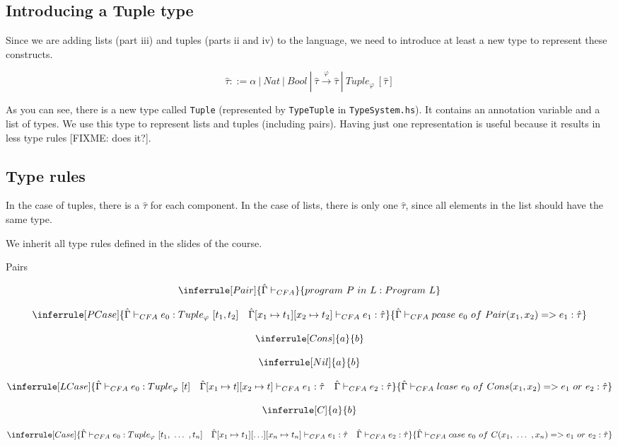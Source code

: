 \documentclass{article}
\begin{document}
\subsection{Introducing a Tuple type}

Since we are adding lists (part iii) and tuples (parts ii and iv) to the language, we need to introduce at least a new type to represent these constructs.

\[\hat{\tau} ::= \alpha\ |\ Nat\ |\ Bool\ |\ \hat{\tau} \overset{\varphi}{\rightarrow} \hat{\tau}\ |\ Tuple_\varphi\ [\hat{\tau}] \]

As you can see, there is a new type called \texttt{Tuple} (represented by \texttt{TypeTuple} in \texttt{TypeSystem.hs}).
It contains an annotation variable and a list of types.
We use this type to represent lists and tuples (including pairs).
Having just one representation is useful because it results in less type rules [FIXME: does it?].

\subsection{Type rules}

In the case of tuples, there is a $\hat{\tau}$ for each component.
In the case of lists, there is only one $\hat{\tau}$, since all elements in the list should have the same type.

We inherit all type rules defined in the slides of the course.

Pairs

\[
\inferrule[Pair]{\hat{\Gamma} \vdash_{CFA}}{program\ P\ in\ L : Program\ L}
\]

\[
\inferrule[PCase]
{\hat{\Gamma} \vdash_{CFA} e_0 : Tuple_\varphi\ [t_1, t_2] \quad \hat{\Gamma}[x_1 \mapsto t_1][x_2 \mapsto t_2] \vdash_{CFA} e_1 : \hat{\tau}}
{\hat{\Gamma} \vdash_{CFA} pcase\ e_0\ of\ Pair(x_1, x_2) => e_1 : \hat{\tau}}
\]

\[
\inferrule[Cons]{a}{b}
\]

\[
\inferrule[Nil]{a}{b}
\]

\[
\inferrule[LCase]
{\hat{\Gamma} \vdash_{CFA} e_0 : Tuple_\varphi\ [t] \quad \hat{\Gamma}[x_1 \mapsto t][x_2 \mapsto t] \vdash_{CFA} e_1 : \hat{\tau} \quad \hat{\Gamma} \vdash_{CFA} e_2 : \hat{\tau}}
{\hat{\Gamma} \vdash_{CFA} lcase\ e_0\ of\ Cons(x_1, x_2) => e_1\ or\ e_2 : \hat{\tau}}
\]

\[
\inferrule[C]{a}{b}
\]

\[
\inferrule[Case]
{\hat{\Gamma} \vdash_{CFA} e_0 : Tuple_\varphi\ [t_1,\ \ldots\ , t_n] \quad \hat{\Gamma}[x_1 \mapsto t_1][\ldots][x_n \mapsto t_n] \vdash_{CFA} e_1 : \hat{\tau} \quad \hat{\Gamma} \vdash_{CFA} e_2 : \hat{\tau}}
{\hat{\Gamma} \vdash_{CFA} case\ e_0\ of\ C(x_1,\ \ldots\ , x_n) => e_1\ or\ e_2 : \hat{\tau}}
\]
\end{document}

